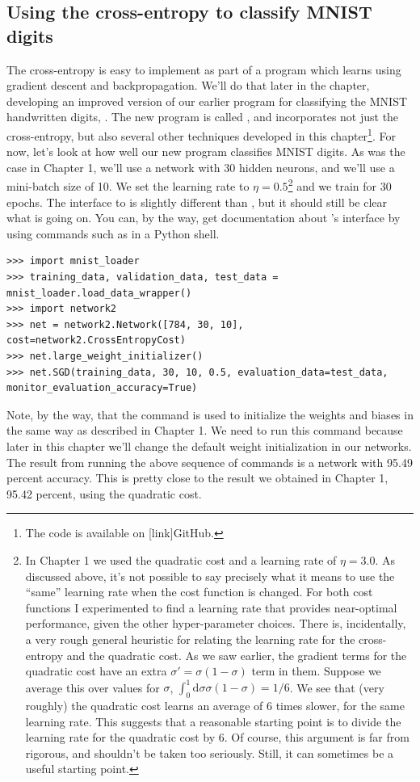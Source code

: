 \documentclass[a4paper,twoside,10pt]{book}
\begin{document}
\subsection{Using the cross-entropy to classify MNIST digits}
The cross-entropy is easy to implement as part of a program which learns using gradient descent and backpropagation. We'll do that later in the chapter, developing an improved version of our earlier program for classifying the MNIST handwritten digits, . The new program is called , and incorporates not just the cross-entropy, but also several other techniques developed in this chapter\footnote{The code is available on [link]GitHub.}. For now, let's look at how well our new program classifies MNIST digits. As was the case in Chapter 1, we'll use a network with 30 hidden neurons, and we'll use a mini-batch size of 10. We set the learning rate to $\eta=0.5$\footnote{In Chapter 1 we used the quadratic cost and a learning rate of $\eta=3.0$. As discussed above, it's not possible to say precisely what it means to use the ``same'' learning rate when the cost function is changed. For both cost functions I experimented to find a learning rate that provides near-optimal performance, given the other hyper-parameter choices. \newline There is, incidentally, a very rough general heuristic for relating the learning rate for the cross-entropy and the quadratic cost. As we saw earlier, the gradient terms for the quadratic cost have an extra $\sigma' = \sigma(1-\sigma)$ term in them. Suppose we average this over values for $\sigma$, $\int_0^1\mathrm{d}\sigma \sigma(1-\sigma)=1/6$. We see that (very roughly) the quadratic cost learns an average of 6 times slower, for the same learning rate. This suggests that a reasonable starting point is to divide the learning rate for the quadratic cost by 6. Of course, this argument is far from rigorous, and shouldn't be taken too seriously. Still, it can sometimes be a useful starting point.} and we train for 30 epochs. The interface to  is slightly different than , but it should still be clear what is going on. You can, by the way, get documentation about 's interface by using commands such as  in a Python shell.
\begin{lstlisting}
>>> import mnist_loader
>>> training_data, validation_data, test_data = mnist_loader.load_data_wrapper()
>>> import network2
>>> net = network2.Network([784, 30, 10], cost=network2.CrossEntropyCost)
>>> net.large_weight_initializer()
>>> net.SGD(training_data, 30, 10, 0.5, evaluation_data=test_data, monitor_evaluation_accuracy=True)
\end{lstlisting}	
Note, by the way, that the  command is used to initialize the weights and biases in the same way as described in Chapter 1. We need to run this command because later in this chapter we'll change the default weight initialization in our networks. The result from running the above sequence of commands is a network with 95.49 percent accuracy. This is pretty close to the result we obtained in Chapter 1, 95.42 percent, using the quadratic cost.
	
\end{document}
